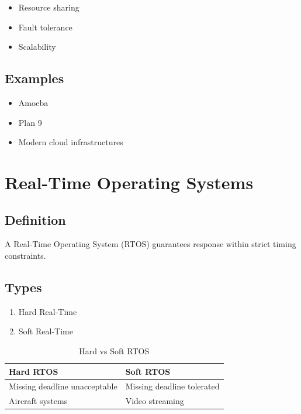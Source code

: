 \begin{itemize}
\item Resource sharing
\item Fault tolerance
\item Scalability
\end{itemize}

\subsection{Examples}

\begin{itemize}
\item Amoeba
\item Plan 9
\item Modern cloud infrastructures
\end{itemize}

\section{Real-Time Operating Systems}

\subsection{Definition}

A Real-Time Operating System (RTOS) guarantees response within strict timing constraints.

\subsection{Types}

\begin{enumerate}
\item Hard Real-Time
\item Soft Real-Time
\end{enumerate}

\begin{table}[H]
\centering
\begin{tabular}{|p{5cm}|p{5cm}|}
\hline
Hard RTOS & Soft RTOS \\
\hline
Missing deadline unacceptable & Missing deadline tolerated \\
\hline
Aircraft systems & Video streaming \\
\hline
\end{tabular}
\caption{Hard vs Soft RTOS}
\end{table}

